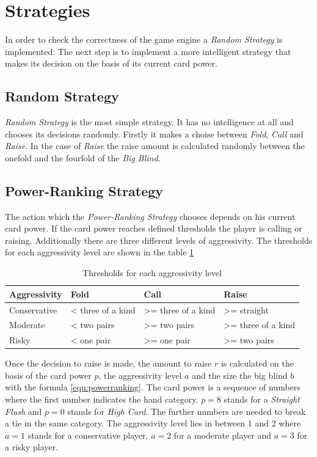 \section{Strategies}
\label{sec:strategies}
In order to check the correctness of the game engine a \emph{Random Strategy} is implemented. The next step is to implement a more intelligent strategy that makes its decision on the basis of its current card power.

\subsection{Random Strategy}
\emph{Random Strategy} is the most simple strategy. It has no intelligence at all and chooses its decisions randomly. Firstly it makes a choise between \emph{Fold}, \emph{Call} and \emph{Raise}. In the case of \emph{Raise} the raise amount is calculated randomly between the onefold and the fourfold of the \emph{Big Blind}.

\subsection{Power-Ranking Strategy}
The action which the \emph{Power-Ranking Strategy} chooses depends on his current card power. If the card power reaches defined thresholds the player is calling or raising. Additionally there are three different levels of aggressivity. The thresholds for each aggressivity level are shown in the table \ref{tbl:powerRankingAggros}

\begin{table}[h]
	\centering
	\begin{tabular}[h]{l|l|l|l}
		\textbf{Aggressivity} & \textbf{Fold} & \textbf{Call} & \textbf{Raise}\\
		\hline
		Conservative & < three of a kind & >= three of a kind & >= straight\\
		Moderate & < two pairs & >= two pairs & >= three of a kind\\
		Risky & < one pair & >= one pair & >= two pairs\\
	\end{tabular}
	\label{tbl:powerRankingAggros}
	\caption{Thresholds for each aggressivity level}
\end{table}

Once the decision to raise is made, the amount to raise $r$ is calculated on the basis of the card power $p$, the aggressivity level $a$ and the size the big blind $b$ with the formula \ref{equ:powerranking}. The card power is a sequence of numbers where the first number indicates the hand category. $p = 8$ stands for a \emph{Straight Flush} and $p = 0$ stands for \emph{High Card}. The further numbers are needed to break a tie in the same category. The aggressivity level lies in between 1 and 2 where $a = 1$ stands for a conservative player, $a = 2$ for a moderate player and $a = 3$ for a risky player.

